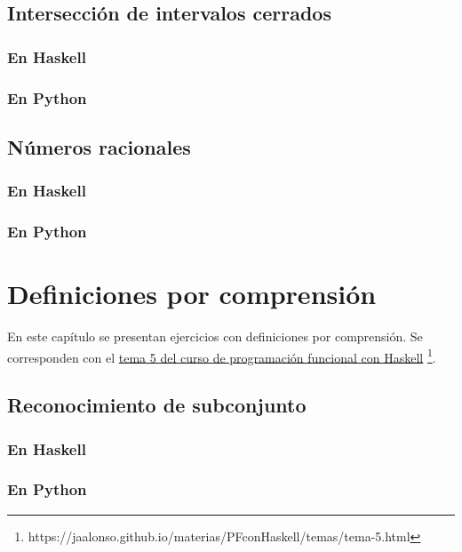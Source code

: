 \documentclass[a4paper,12pt,twoside]{book}
\begin{document}
\section{Intersección de intervalos cerrados}
\subsection*{En Haskell}
\subsection*{En Python}

\section{Números racionales}
\subsection*{En Haskell}
\subsection*{En Python}

\chapter{Definiciones por comprensión}

En este capítulo se presentan ejercicios con definiciones por
comprensión. Se corresponden con el
\href{https://jaalonso.github.io/materias/PFconHaskell/temas/tema-5.html}
{tema 5 del curso de programación funcional con Haskell}
\footnote{https://jaalonso.github.io/materias/PFconHaskell/temas/tema-5.html}.

\minitoc

\section{Reconocimiento de subconjunto}
\subsection*{En Haskell}
\subsection*{En Python}
\end{document}
